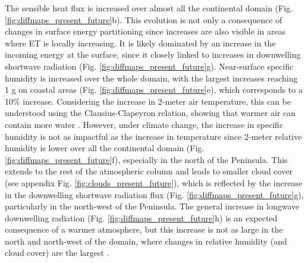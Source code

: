 The sensible heat flux is increased over almost all the continental domain  (Fig. \ref{fig:diffmaps_present_future}b). This evolution is not only a consequence of changes in surface energy partitioning since increases are also visible in areas where ET is locally increasing. It is likely dominated by an increase in the incoming energy at the surface, since it closely linked to increases in downwelling shortwave radiation (Fig. \ref{fig:diffmaps_present_future}g).
Near-surface specific humidity is increased over the whole domain, with the largest increases reaching 1 g \perkg on coastal areas (Fig. \ref{fig:diffmaps_present_future}e), which corresponds to a 10\% increase. Considering the increase in 2-meter air temperature, this can be understood using the Clausius-Clapeyron relation, showing that warmer air can contain more water \citep[in theory up to +7\% for a 1°C increase, Chapter 8 in][]{IPCC_2023}.
However, under climate change, the increase in specific humidity is not as impactful as the increase in temperature since 2-meter relative humidity is lower over all the continental domain (Fig. \ref{fig:diffmaps_present_future}f), especially in the north of the Peninsula. 
This extends to the rest of the atmospheric column and leads to smaller cloud cover (see appendix Fig. \ref{fig:clouds_present_future}), which is reflected by the increase in the downwelling shortwave radiation flux (Fig. \ref{fig:diffmaps_present_future}g), particularly in the north-west of the Peninsula. 
The general increase in longwave downwelling radiation (Fig. \ref{fig:diffmaps_present_future}h) is an expected consequence of a warmer atmosphere, but this increase is not as large in the north and north-west of the domain, where changes in relative humidity (and cloud cover) are the largest . 

